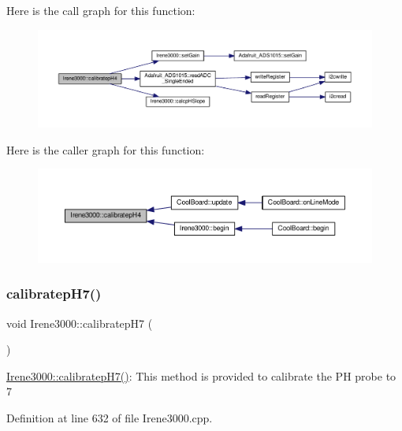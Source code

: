 Here is the call graph for this function\+:\nopagebreak
\begin{figure}[H]
\begin{center}
\leavevmode
\includegraphics[width=350pt]{class_irene3000_aa140dd026922a04981edfd04d46cabbe_cgraph}
\end{center}
\end{figure}
Here is the caller graph for this function\+:\nopagebreak
\begin{figure}[H]
\begin{center}
\leavevmode
\includegraphics[width=350pt]{class_irene3000_aa140dd026922a04981edfd04d46cabbe_icgraph}
\end{center}
\end{figure}
\mbox{\label{class_irene3000_a1d3299202e4cb7afcff9c9e3e95d94c1}} 
\subsubsection{\texorpdfstring{calibratep\+H7()}{calibratepH7()}}
{\footnotesize\ttfamily void Irene3000\+::calibratep\+H7 (\begin{DoxyParamCaption}{ }\end{DoxyParamCaption})}

\hyperlink{class_irene3000_a1d3299202e4cb7afcff9c9e3e95d94c1}{Irene3000\+::calibratep\+H7()}\+: This method is provided to calibrate the PH probe to 7 

Definition at line 632 of file Irene3000.\+cpp.


